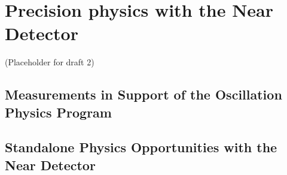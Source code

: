 %


\chapter{Precision physics with the Near Detector}
\label{ch:prec-nd}

(Placeholder for draft 2)

\section{Measurements in Support of the Oscillation Physics Program}
\label{sec:prec-nd-support}


\section{Standalone Physics Opportunities with the Near Detector}
\label{sec:prec-nd-standalone}
